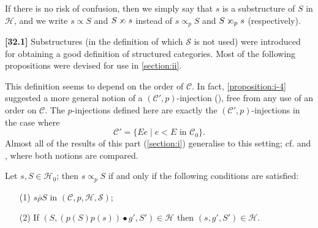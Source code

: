 \documentclass[a4paper,fleqn]{article}
\theoremstyle{plain}
\newenvironment{proposition}[1]
  {\renewcommand\theinnerproposition{#1}\innerproposition}
  {\endinnerproposition}
\theoremstyle{definition}
\newenvironment{longcomm}[1]
  {\noindent\textbf{[#1]}\rmfamily}
  {}
\newcommand{\CC}{\mathcal{C}}
\newcommand{\HH}{\mathcal{H}}
\renewcommand{\SS}{\mathcal{S}}
\newcommand{\relrhobar}{\mathrel{\overline{\rho}}}
\newcommand{\subs}{\mathrel{\propto}}
\newcommand{\sups}{\mathrel{\reflectbox{$\propto$}}}
\newcommand{\smallbullet}{\bullet}
\begin{document}
If there is no risk of confusion, then we simply say that $s$ is a substructure of $S$ in $\HH$, and we write $s\subs S$ and $S\sups s$ instead of $s\subs_p S$ and $S\sups_p s$ (respectively).

\begin{longcomm}{32.1}
  Substructures (in the definition of which $\SS$ is not used) were introduced for obtaining a good definition of structured categories.
  Most of the following propositions were devised for use in \cref{section:ii}.

  This definition seems to depend on the order of $\CC$.
  In fact, \cref{proposition:i-4} suggested a more general notion of a $(\CC',p)$-injection (\cite{coll69,coll66}), free from any use of an order on $\CC$.
  The $p$-injections defined here are exactly the $(\CC',p)$-injections in the case where
  \[
    \CC'
    = \{Ee \mid e<E\text{ in }\CC_0\}.
  \]
  Almost all of the results of this part (\cref{section:i}) generalise to this setting; cf. \cite{coll66} and \cite{coll69}, where both notions are compared.
\end{longcomm}

\begin{proposition}{4}
\label{proposition:i-4}
  Let $s,S\in\HH_0$;
  then $s\subs_p S$ if and only if the following conditions are satisfied:
  \begin{enumerate}
    \item[\normalfont(1\textquotesingle)]
      $s\relrhobar S$ in $(\CC,p,\HH,\SS)$;
    \item[\normalfont(2\textquotesingle)]
      If $(S,(p(S)p(s))\smallbullet g',S')\in\HH$ then $(s,g',S')\in\HH$.
  \end{enumerate}
\end{proposition}
\end{document}
